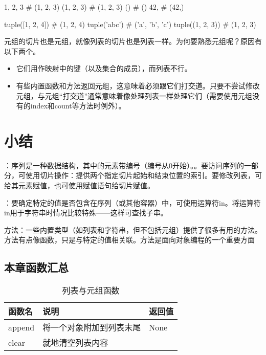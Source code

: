 \begin{pyc}
1, 2, 3  # (1, 2, 3)
(1, 2, 3)  # (1, 2, 3)
()  # ()
42,  # (42,)

tuple([1, 2, 4])  # (1, 2, 4)
tuple('abc')  # ('a', 'b', 'c')
tuple((1, 2, 3))  # (1, 2, 3)
\end{pyc}

元组的切片也是元组，就像列表的切片也是列表一样。为何要熟悉元组呢？原因有以下两个。
\begin{itemize}
    \item 它们用作映射中的键（以及集合的成员），而列表不行。
    \item 有些内置函数和方法返回元组，这意味着必须跟它们打交道。只要不尝试修改元组，与元组“打交道”通常意味着像处理列表一样处理它们（需要使用元组没有的index和count等方法时例外）。
\end{itemize}
\section{小结}
\begin{dinglist}{42}
    \item {}：序列是一种数据结构，其中的元素带编号（编号从0开始）。。要访问序列的一部分，可使用切片操作：提供两个指定切片起始和结束位置的索引。要修改列表，可给其元素赋值，也可使用赋值语句给切片赋值。
    \item {}：要确定特定的值是否包含在序列（或其他容器）中，可使用运算符in。将运算符in用于字符串时情况比较特殊——这样可查找子串。
    \item 方法：一些内置类型（如列表和字符串，但不包括元组）提供了很多有用的方法。方法有点像函数，只是与特定的值相关联。方法是面向对象编程的一个重要方面
\end{dinglist}

\subsection{本章函数汇总}
\begin{table}
    \caption{列表与元组函数}
    \begin{tabularx}{\textwidth}{lXl}
        \hline
        函数名    & 说明           & 返回值  \\
        \hline
        append & 将一个对象附加到列表末尾 & None \\
        clear  & 就地清空列表内容     &      \\
        \hline
    \end{tabularx}
\end{table}